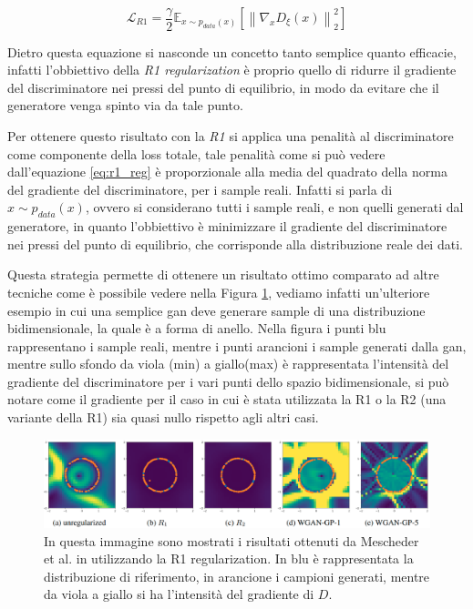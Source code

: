 \begin{equation}
    \label{eq:r1_reg}
    \mathcal{L}_{R1} = \frac{\gamma}{2} \mathbb{E}_{x \sim p_{data}(x)} \left[ \left\| \nabla_{x} D_{\xi}(x) \right\|_{2}^{2} \right]
\end{equation}

Dietro questa equazione si nasconde un concetto tanto semplice quanto efficacie, infatti l'obbiettivo della \textit{R1 regularization}
è proprio quello di ridurre il gradiente del discriminatore nei pressi del punto di equilibrio, in modo da evitare che il generatore
venga spinto via da tale punto.

Per ottenere questo risultato con la \textit{R1} si applica una penalità al discriminatore come componente della loss totale, tale penalità come si
può vedere dall'equazione \ref{eq:r1_reg} è proporzionale alla media del quadrato della norma del gradiente del discriminatore, per i sample reali.
Infatti si parla di $x \sim p_{data}(x)$, ovvero si considerano tutti i sample reali, e non quelli generati dal generatore, in quanto l'obbiettivo
è minimizzare il gradiente del discriminatore nei pressi del punto di equilibrio, che corrisponde alla distribuzione reale dei dati.

Questa strategia permette di ottenere un risultato ottimo comparato ad altre tecniche come è possibile vedere nella Figura \ref{fig:r1_reg},
vediamo infatti un'ulteriore esempio in cui una semplice gan deve generare sample di una distribuzione bidimensionale, la quale è a 
forma di anello. Nella figura i punti blu rappresentano i sample reali, mentre i punti arancioni i sample generati dalla gan, 
mentre sullo sfondo da viola (min) a giallo(max) è rappresentata l'intensità del gradiente del discriminatore per i vari punti 
dello spazio bidimensionale, si può notare come il gradiente per il caso in cui è stata utilizzata la R1 o la R2 
(una variante della R1) sia quasi nullo rispetto agli altri casi.

    \begin{figure}[H]
        \centering
        \includegraphics[width=1.0\textwidth]{imgs/r1_reg.png}
        \caption{In questa immagine sono mostrati i risultati ottenuti da Mescheder et al. in \cite{mescheder2018training} 
            utilizzando la R1 regularization. In blu è rappresentata la distribuzione di riferimento, in arancione i campioni generati, mentre da viola a giallo
            si ha l'intensità del gradiente di $D$.}
        \label{fig:r1_reg}
    \end{figure}

